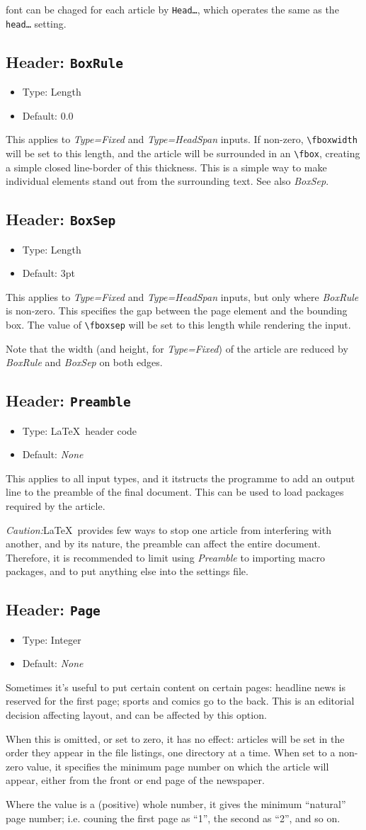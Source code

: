 \documentclass[a4paper,DIV=11]{scrartcl}
\newcommand{\property}[5]{
  \subsection{#1: \texttt{#2}}
  \begin{itemize}
  \item Type: #3
  \item Default: #4
  \end{itemize}
  #5
}
\newcommand{\header}{\property{Header}}
\begin{document}
\begin{multicols}{2}
{  font can be chaged for each article by \texttt{Head\dots}, which
  operates the same as the \texttt{head\dots} setting.
}
\header{BoxRule}{Length}{0.0}{
  This applies to \textit{Type=Fixed} and \textit{Type=HeadSpan}
  inputs. If non-zero, \texttt{\textbackslash fboxwidth} will be set
  to this length, and the article will be surrounded in an
  \texttt{\textbackslash fbox}, creating a simple closed line-border
  of this thickness. This is a simple way to make individual elements
  stand out from the surrounding text. See also \textit{BoxSep}.
}
\header{BoxSep}{Length}{3pt}{
  This applies to \textit{Type=Fixed} and \textit{Type=HeadSpan}
  inputs, but only where \textit{BoxRule} is non-zero. This specifies
  the gap between the page element and the bounding box. The value of
  \texttt{\textbackslash fboxsep} will be set to this length while
  rendering the input.\par Note that the width (and height, for
  \textit{Type=Fixed}) of the article are reduced by \textit{BoxRule}
  and \textit{BoxSep} on both edges.
}
\header{Preamble}{\LaTeX\ header code}{\textit{None}}{
  This applies to all input types, and it itstructs the programme to
  add an output line to the preamble of the final document. This
  can be used to load packages required by the article.\par
  \textit{Caution:}\LaTeX\ provides few ways to stop one article from
  interfering with another, and by its nature, the preamble can affect
  the entire document. Therefore, it is recommended to limit using
  \textit{Preamble} to importing macro packages, and to put anything
  else into the settings file.
}
\header{Page}{Integer}{\textit{None}}{
  Sometimes it's useful to put certain content on certain pages:
  headline news is reserved for the first page; sports and comics go
  to the back. This is an editorial decision affecting layout, and can
  be affected by this option.
  
  When this is omitted, or set to zero, it has no effect: articles
  will be set in the order they appear in the file listings, one
  directory at a time. When set to a non-zero value, it specifies the
  minimum page number on which the article will appear, either from
  the front or end page of the newspaper.
  
  Where the value is a (positive) whole number, it gives the minimum
  ``natural'' page number; i.e. couning the first page
  as ``1'', the second as ``2'', and so on.

}
\end{multicols}
\end{document}
